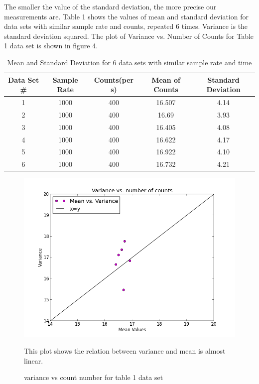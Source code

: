 \documentclass[letterpaper,12pt]{article}
\begin{document}
The smaller the value of the standard deviation, the more precise our measurements are. Table 1 shows the values of mean and standard deviation for data sets with similar sample rate and counts, repeated 6 times. Variance is the standard deviation squared. The plot of Variance vs. Number of Counts for Table 1 data set is shown in figure 4.

\begin{table}[ht]
\caption{Mean and Standard Deviation for 6 data sets with similar sample rate and time} %
\centering %
\begin{tabular}{c c c c c} %
\hline\hline %
Data Set \# & Sample Rate & Counts(per s) & Mean of Counts & Standard Deviation \\ [0.5ex] %
\hline %
1 & 1000 & 400 & 16.507 & 4.14\\ %
2 & 1000 & 400& 16.69  & 3.93\\
3 & 1000 & 400& 16.405  & 4.08\\
4 & 1000 & 400 & 16.622 & 4.17\\
5 & 1000 & 400 & 16.922 & 4.10\\ 
6 & 1000 & 400 & 16.732 & 4.21 \\ [1ex] %
\hline %
\end{tabular}
\label{table:nonlin} %
\end{table}

\begin{figure}
\centering
\includegraphics[scale=0.6]{variance-vs-count-number-400.png}
\caption{variance vs count number for table 1 data set}
This plot shows the relation between variance and mean is almost linear.
\end{figure}
\end{document}
